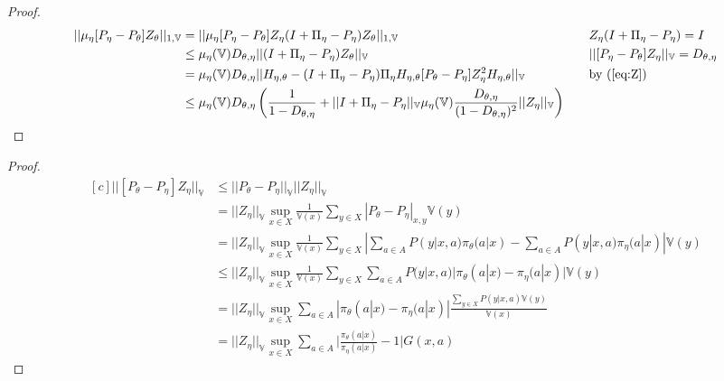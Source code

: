 \documentclass[11pt]{article}
\newcommand{\V}{\mathbb{V}}
\theoremstyle{definition}
\numberwithin{equation}{section}
\begin{document}
\begin{proof}
      
    \begin{equation*} 
\begin{aligned}[c]
     || \mu_{\eta}[P_{\eta} - P_{\theta}] Z_\theta||_{1, \V} &=  || \mu_{\eta}[P_{\eta} - P_{\theta}] Z_{\eta} (I+\Pi_\eta - P_\eta) Z_\theta||_{1, \V}& \quad &  Z_{\eta} (I+\Pi_\eta - P_\eta) = I\\
     & \leq \mu_{\eta}(\V)  D_{\theta, \eta}  || (I+\Pi_\eta - P_\eta) Z_{\theta} ||_\V  & \quad & ||  [P_{\eta} - P_{\theta}] Z_{\eta} ||_\V = D_{\theta, \eta}  \\
     & = \mu_{\eta}(\V)  D_{\theta, \eta}  ||  H_{\eta, \theta} - (I+\Pi_\eta - P_\eta) \Pi_{\eta} H_{\eta, \theta}[P_\theta - P_{\eta}]Z^2_{\eta}H_{\eta, \theta}   ||_\V    & \quad &  \text{by (\ref{eq:Z})}\\
     &  \leq   \mu_{\eta}(\V)  D_{\theta, \eta}  \left( \frac{1}{1- D_{\theta, \eta} } + ||I+\Pi_\eta - P_\eta||_\V \mu_{\eta}(\V) \frac{ D_{\theta, \eta} }{(1- D_{\theta, \eta} )^2} ||Z_{\eta}||_\V  \right)
\end{aligned}
 \end{equation*}
     
     
     
\end{proof}







\policies*

\begin{proof}

    \begin{equation*} 
\begin{aligned}[c]
     ||  [P_{\theta} - P_{\eta}] Z_{\eta}||_\V&\leq  ||  P_{\theta} - P_{\eta} ||_\V||Z_{\eta}||_\V\\
     & = ||Z_{\eta}||_\V\sup\limits_{x\in X}\frac{1}{\V(x)} \sum\limits_{y\in X} |P_{\theta} - P_{\eta}|_{x, y} \V(y)\\
     & = ||Z_{\eta}||_\V\sup\limits_{x\in X}\frac{1}{\V(x)} \sum\limits_{y\in X} | \sum\limits_{a\in A} P(y|x, a)\pi_\theta(a|x) - \sum\limits_{a\in A} P(y|x, a)\pi_{\eta}(a|x)| \V(y)\\
          & \leq ||Z_{\eta}||_\V\sup\limits_{x\in X}\frac{1}{\V(x)} \sum\limits_{y\in X} \sum\limits_{a\in A} P(y|x, a) | \pi_\theta(a|x) -  \pi_{\eta}(a|x)| \V(y)\\
          & =||Z_{\eta}||_\V\sup\limits_{x\in X}    \sum\limits_{a\in A} | \pi_\theta(a|x) -  \pi_{\eta}(a|x)|    \frac{\sum\limits_{y\in X} P(y|x, a) \V(y) }{\V(x)} \\
          &= ||Z_{\eta}||_\V\sup\limits_{x\in X}    \sum\limits_{a\in A} \Big| \frac{\pi_\theta(a|x)}{ \pi_{\eta}(a|x)} - 1\Big|   G(x, a)
\end{aligned}
 \end{equation*}
\end{proof}
\end{document}
